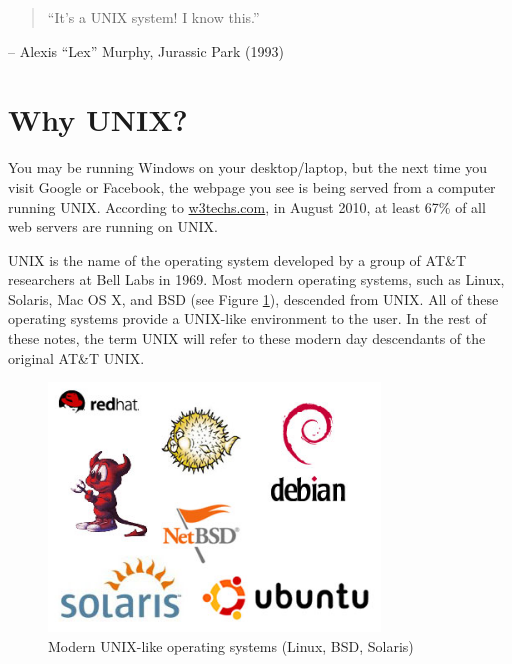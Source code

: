 \begin{frame}
\begin{quote}
``It's a UNIX system! I know this.''
\end{quote}
\begin{flushright}
-- Alexis ``Lex'' Murphy, Jurassic Park (1993)
\end{flushright}
\end{frame}

\section{Why UNIX?} %
You may be running Windows on your desktop/laptop, but the next time you visit
Google or Facebook, the webpage you see is being served from a computer running
UNIX. According to \url{w3techs.com}, in August 2010, at least 67\% of all web
servers are running on UNIX.

UNIX is the name of the operating system developed by a group of AT\&T
researchers at Bell Labs in 1969.  Most modern operating systems, such as Linux,
Solaris, Mac OS X, and BSD (see Figure \ref{fig:modern}), descended from UNIX.
All of these operating systems provide a UNIX-like environment to the user. In
the rest of these notes, the term UNIX will refer to these modern day
descendants of the original AT\&T UNIX.   

\begin{frame}
\begin{figure}
\begin{center}
\includegraphics[width=250pt]{unix_logos}
\caption{Modern UNIX-like operating systems (Linux, BSD, Solaris)}
\label{fig:modern}
\end{center}
\end{figure}
\end{frame}

